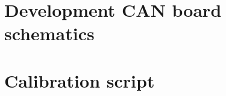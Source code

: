 %



\cleardoublepage
\pagestyle{plain}

\setcounter{page}{1}
\pagestyle{plain}
\setlength{\voffset}{\originalVOffset}
\setlength{\hoffset}{\originalHOffset}
\chapter{Development CAN board schematics}
\label{appendix:can_schematics}
\pagebreak


\setcounter{page}{1}
\pagestyle{plain}
\chapter{Calibration script}
\label{appendix:calibration_script}
